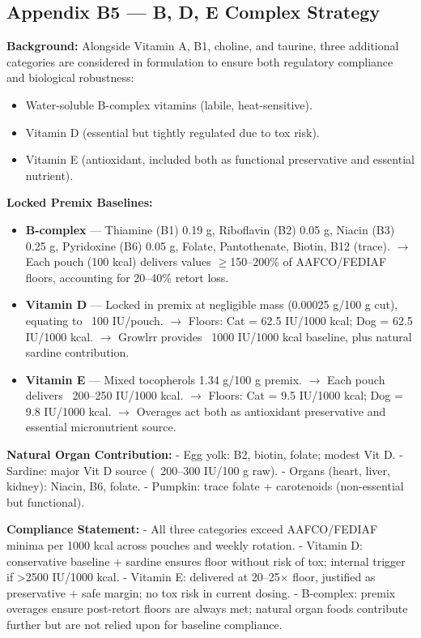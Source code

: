 \subsection*{Appendix B5 --- B, D, E Complex Strategy}

\textbf{Background:}  
Alongside Vitamin A, B1, choline, and taurine, three additional categories are considered in formulation to ensure both regulatory compliance and biological robustness:  
\begin{itemize}[leftmargin=1.2em]
  \item Water-soluble B-complex vitamins (labile, heat-sensitive).  
  \item Vitamin D (essential but tightly regulated due to tox risk).  
  \item Vitamin E (antioxidant, included both as functional preservative and essential nutrient).  
\end{itemize}

\textbf{Locked Premix Baselines:}  
\begin{itemize}[leftmargin=1.2em]
  \item \textbf{B-complex} ---  
    Thiamine (B1) 0.19 g, Riboflavin (B2) 0.05 g, Niacin (B3) 0.25 g, Pyridoxine (B6) 0.05 g, Folate, Pantothenate, Biotin, B12 (trace).  
    $\rightarrow$ Each pouch (100 kcal) delivers values $\geq$150--200\% of AAFCO/FEDIAF floors, accounting for 20--40\% retort loss.  
  \item \textbf{Vitamin D} ---  
    Locked in premix at negligible mass (0.00025 g/100 g cut), equating to ~100 IU/pouch.  
    $\rightarrow$ Floors: Cat = 62.5 IU/1000 kcal; Dog = 62.5 IU/1000 kcal.  
    $\rightarrow$ Growlrr provides ~1000 IU/1000 kcal baseline, plus natural sardine contribution.  
  \item \textbf{Vitamin E} ---  
    Mixed tocopherols 1.34 g/100 g premix.  
    $\rightarrow$ Each pouch delivers ~200--250 IU/1000 kcal.  
    $\rightarrow$ Floors: Cat = 9.5 IU/1000 kcal; Dog = 9.8 IU/1000 kcal.  
    $\rightarrow$ Overages act both as antioxidant preservative and essential micronutrient source.  
\end{itemize}

\textbf{Natural Organ Contribution:}  
- Egg yolk: B2, biotin, folate; modest Vit D.  
- Sardine: major Vit D source (~200--300 IU/100 g raw).  
- Organs (heart, liver, kidney): Niacin, B6, folate.  
- Pumpkin: trace folate + carotenoids (non-essential but functional).  

\textbf{Compliance Statement:}  
- All three categories exceed AAFCO/FEDIAF minima per 1000 kcal across pouches and weekly rotation.  
- Vitamin D: conservative baseline + sardine ensures floor without risk of tox; internal trigger if >2500 IU/1000 kcal.  
- Vitamin E: delivered at 20--25$\times$ floor, justified as preservative + safe margin; no tox risk in current dosing.  
- B-complex: premix overages ensure post-retort floors are always met; natural organ foods contribute further but are not relied upon for baseline compliance.  

